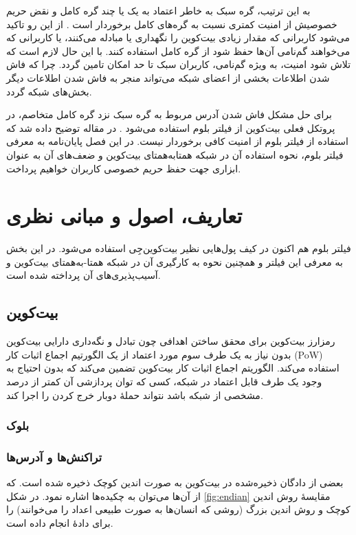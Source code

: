 به این ترتیب،‌ گره سبک به خاطر اعتماد به یک یا چند گره کامل و نقض حریم خصوصیش از امنیت کمتری نسبت به گره‌های کامل برخوردار است \cite{Sompolinsky2016}. از این رو تاکید می‌شود کاربرانی که مقدار زیادی بیت‌کوین را نگهداری یا مبادله می‌کنند، یا کاربرانی که می‌خواهند گم‌نامی آن‌ها حفظ شود از گره‌ کامل استفاده کنند. با این حال لازم است که تلاش شود امنیت، به ویژه گم‌نامی، کاربران سبک تا حد امکان تامین گردد. چرا که فاش شدن اطلاعات بخشی از اعضای شبکه می‌تواند منجر به فاش شدن اطلاعات دیگر بخش‌های شبکه گردد.

برای حل مشکل فاش شدن آدرس مربوط به گره سبک نزد گره کامل متخاصم، در پروتکل فعلی بیت‌کوین از فیلتر بلوم استفاده می‌شود \cite{Hearn2013}. در مقاله \cite{Gervais2014} توضیح داده ‌شد که استفاده از فیلتر بلوم از امنیت کافی برخوردار نیست. در این فصل پایان‌نامه به معرفی فیلتر بلوم، نحوه استفاده آن در شبکه همتا‌به‌همتای بیت‌کوین و ضعف‌های آن به عنوان ابزاری جهت حفظ حریم خصوصی کاربران خواهیم پرداخت.

\section{تعاریف، اصول و مبانی نظری}



فیلتر بلوم هم اکنون در کیف پول‌هایی نظیر بیت‌کوین‌جِی \cite{bitcoinj} استفاده می‌شود. در این بخش به معرفی این فیلتر و همچنین نحوه به کارگیری آن در شبکه همتا-به‌همتای بیت‌کوین و آسیب‌پذیری‌های آن پرداخته شده است.

\subsection{بیت‌کوین}

رمزارز بیت‌کوین برای محقق ساختن اهدافی چون تبادل و نگه‌داری دارایی بیت‌کوین بدون نیاز به یک طرف سوم مورد اعتماد از یک الگورتیم اجماع اثبات کار
(PoW)
استفاده می‌کند\cite{Nakamoto2009}. الگوریتم اجماع اثبات کار بیت‌کوین تضمین می‌کند که بدون احتیاج به  وجود یک طرف قابل اعتماد در شبکه، کسی که توان پردازشی آن کمتر از درصد مشخصی از شبکه باشد نتواند حملهٔ دوبار خرج کردن
را اجرا کند.

\subsubsection{بلوک}

\subsubsection{تراکنش‌ها و آدرس‌ها‌}
بعضی از دادگان ذخیره‌شده در بیت‌کوین به صورت 
اندین کوچک
ذخیره شده است. که از آن‌ها می‌توان به چکیده‌ها اشاره نمود. در شکل \ref{fig:endian} مقایسهٔ روش اندین کوچک و روش اندین بزرگ  (روشی که انسان‌ها به صورت طبیعی اعداد را می‌خوانند) را برای دادهٔ  انجام داده است.

